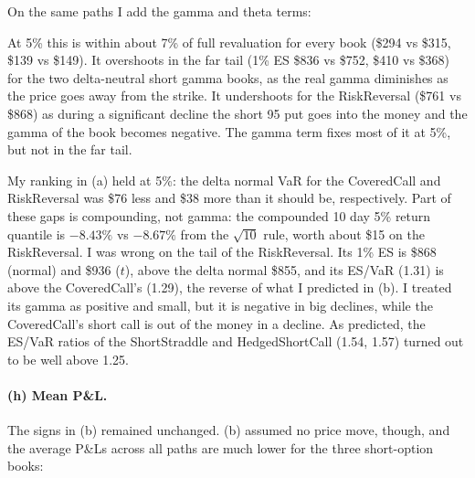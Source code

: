 \documentclass[11pt]{article}
\newcommand{\tbl}[1]{}
\begin{document}
On the same paths I add the gamma and theta terms:

\begin{table}[H]
\centering\small
\caption{Delta-gamma-theta approximation on the normal paths (\$).}
\tbl{p3_dgt}
\end{table}

At 5\% this is within about 7\% of full revaluation for every book (\$294 vs \$315, \$139 vs \$149). It overshoots in the far tail (1\% ES \$836 vs \$752, \$410 vs \$368) for the two delta-neutral short gamma books, as the real gamma diminishes as the price goes away from the strike. It undershoots for the RiskReversal (\$761 vs \$868) as during a significant decline the short 95 put goes into the money and the gamma of the book becomes negative. The gamma term fixes most of it at 5\%, but not in the far tail.

My ranking in (a) held at 5\%: the delta normal VaR for the CoveredCall and RiskReversal was \$76 less and \$38 more than it should be, respectively. Part of these gaps is compounding, not gamma: the compounded 10 day 5\% return quantile is $-8.43\%$ vs $-8.67\%$ from the $\sqrt{10}$ rule, worth about \$15 on the RiskReversal. I was wrong on the tail of the RiskReversal. Its 1\% ES is \$868 (normal) and \$936 ($t$), above the delta normal \$855, and its ES/VaR (1.31) is above the CoveredCall's (1.29), the reverse of what I predicted in (b). I treated its gamma as positive and small, but it is negative in big declines, while the CoveredCall's short call is out of the money in a decline. As predicted, the ES/VaR ratios of the ShortStraddle and HedgedShortCall (1.54, 1.57) turned out to be well above 1.25.

\paragraph{(h) Mean P\&L.} The signs in (b) remained unchanged. (b) assumed no price move, though, and the average P\&Ls across all paths are much lower for the three short-option books:

\begin{table}[H]
\centering\small
\caption{10 day mean P\&L and its parts (\$, normal model). Theta carry plus the expected gamma P\&L equals the financing term plus the vol premium.}
\label{tab:p3carry}
\resizebox{\textwidth}{!}{\tbl{p3_carry}}
\end{table}
\end{document}
